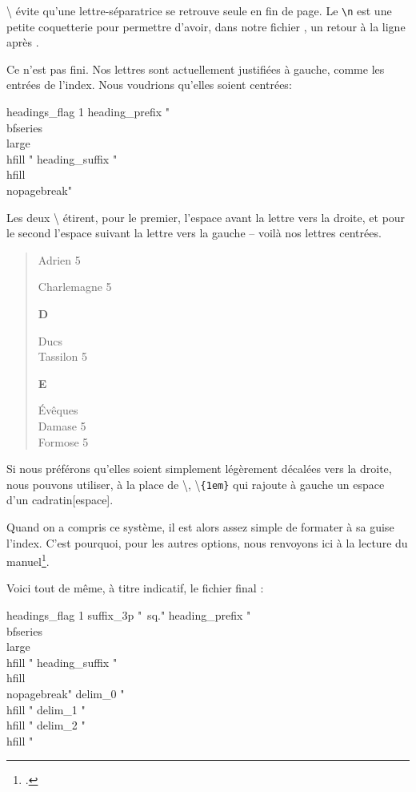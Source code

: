 \textbackslash{} évite qu'une lettre-séparatrice se retrouve seule en fin de page. Le \verb|\n| est une petite coquetterie pour permettre d'avoir, dans notre fichier , un retour à la ligne après .



Ce n'est pas fini. Nos lettres sont actuellement justifiées à gauche, comme les entrées de l'index. Nous voudrions qu'elles soient centrées: 

\begin{latexcode}
headings_flag 1
heading_prefix " {\\bfseries\\large\\hfill " 
heading_suffix " \\hfill}\\nopagebreak\n " 
\end{latexcode}

Les deux \textbackslash{} étirent, pour le premier, l'espace avant la lettre vers la droite, et pour le second l'espace suivant la lettre vers la gauche -- voilà nos lettres centrées.

\begin{quotation}
\parindent=0pt
\addtolength{\parskip}{\baselineskip}
Adrien \hfill 5 


Charlemagne \hfill 5 

{\hfill\large{\textbf{D}}\hfill}

Ducs \\
\hspace*{1em} Tassilon \hfill 5

{\hfill\large{\textbf{E}}\hfill}

Évêques \\
\hspace*{1em} Damase \hfill 5\\
\hspace*{1em} Formose \hfill  5
\end{quotation}


Si nous préférons qu'elles soient simplement légèrement décalées vers la droite, nous pouvons utiliser, à la place de \textbackslash{}, \textbackslash{}\verb|{1em}| qui rajoute à gauche un espace d'un cadratin[espace].


Quand on a compris ce système, il est alors assez simple de formater à sa guise l'index. C'est pourquoi, pour les autres options, nous renvoyons ici à la lecture du manuel\footcite[On pourra aussi consulter][]{frama_index}. 

Voici tout de même, à titre indicatif, le fichier final :

\begin{latexcode}
headings_flag 1
suffix_3p "~sq."
heading_prefix " {\\bfseries\\large\\hfill " 
heading_suffix " \\hfill}\\nopagebreak\n " 
delim_0 "\\hfill "
delim_1 "\\hfill "
delim_2 "\\hfill "
\end{latexcode}




